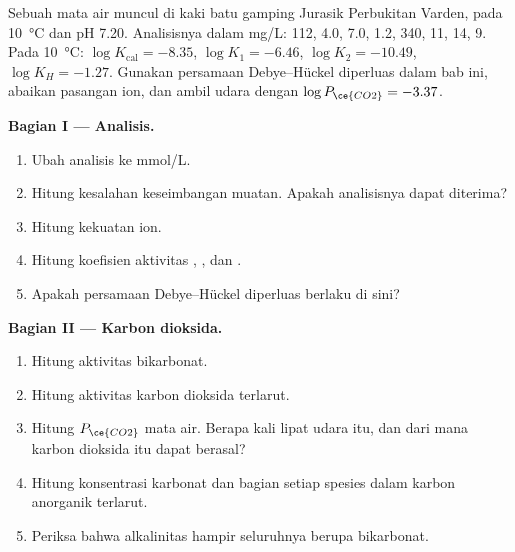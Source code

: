 \begin{problem}
\label{pb:b3:water-rock-interaction:1}
Sebuah mata air muncul di kaki batu gamping Jurasik Perbukitan Varden, pada
\qty{10}{\celsius} dan pH 7.20. Analisisnya dalam \unit{mg/L}: 
112,  4.0,  7.0,  1.2,  340,  11,
 14,  9. Pada \qty{10}{\celsius}: $\log K_{\mathrm{cal}} =
-8.35$, $\log K_1 = -6.46$, $\log K_2 = -10.49$, $\log K_H = -1.27$. Gunakan
persamaan Debye--Hückel diperluas dalam bab ini, abaikan pasangan ion, dan ambil
udara dengan $\log P_{\ce{CO2}} = -3.37$.

\medskip\noindent\textbf{Bagian I --- Analisis.}
\begin{enumerate}
\item Ubah analisis ke \unit{mmol/L}.
\item Hitung kesalahan keseimbangan muatan. Apakah analisisnya dapat diterima?
\item Hitung kekuatan ion.
\item Hitung koefisien aktivitas , , dan
  .
\item Apakah persamaan Debye--Hückel diperluas berlaku di sini?
\end{enumerate}

\medskip\noindent\textbf{Bagian II --- Karbon dioksida.}
\begin{enumerate}[resume]
\item Hitung aktivitas bikarbonat.
\item Hitung aktivitas karbon dioksida terlarut.
\item Hitung $P_{\ce{CO2}}$ mata air. Berapa kali lipat udara itu,
  dan dari mana karbon dioksida itu dapat berasal?
\item Hitung konsentrasi karbonat dan bagian setiap spesies dalam
  karbon anorganik terlarut.
\item Periksa bahwa alkalinitas hampir seluruhnya berupa bikarbonat.
\end{enumerate}


\end{problem}
